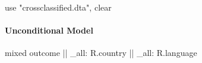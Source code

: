 \documentclass[
  letterpaper,
  DIV=11,
  numbers=noendperiod]{scrreprt}
\let\oldparagraph\paragraph
\renewcommand{\paragraph}[1]{\oldparagraph{#1}\mbox{}}
\newenvironment{Shaded}{\begin{snugshade}}{\end{snugshade}}
\newcommand{\DataTypeTok}[1]{\textcolor[rgb]{0.68,0.00,0.00}{#1}}
\newcommand{\KeywordTok}[1]{\textcolor[rgb]{0.00,0.23,0.31}{#1}}
\newcommand{\NormalTok}[1]{\textcolor[rgb]{0.00,0.23,0.31}{#1}}
\newcommand{\StringTok}[1]{\textcolor[rgb]{0.13,0.47,0.30}{#1}}
\begin{document}
\begin{Shaded}
\begin{Highlighting}[]

\KeywordTok{use} \StringTok{"crossclassified.dta"}\NormalTok{, }\KeywordTok{clear}
\end{Highlighting}
\end{Shaded}

\paragraph{Unconditional Model}\label{unconditional-model-3}

\begin{Shaded}
\begin{Highlighting}[]

\NormalTok{mixed outcome || }\DataTypeTok{\_all}\NormalTok{: R.country || }\DataTypeTok{\_all}\NormalTok{: R.language}
\end{Highlighting}
\end{Shaded}
\end{document}
